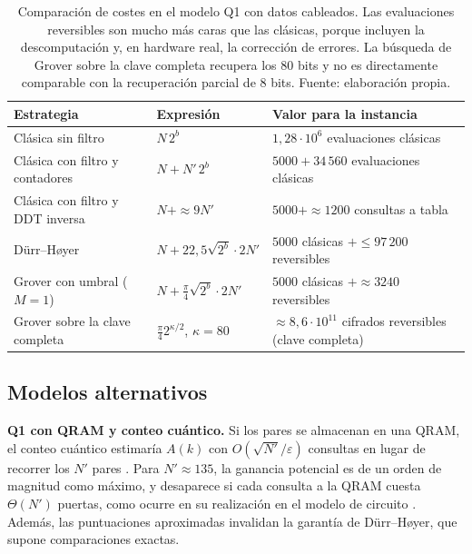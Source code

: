 \begin{table}[H]
\centering
\small
\begin{tabular}{p{} p{} p{}}
\hline\hline
Estrategia & Expresión & Valor para la instancia \\
\hline
Clásica sin filtro & \(N\,2^b\) & \(1{,}28\cdot 10^6\) evaluaciones clásicas \\
Clásica con filtro y contadores & \(N+N'\,2^b\) & \(5000+34\,560\) evaluaciones clásicas \\
Clásica con filtro y DDT inversa & \(N+\approx 9N'\) & \(5000+\approx 1200\) consultas a tabla \\
Dürr--Høyer & \(N+22{,}5\sqrt{2^b}\cdot 2N'\) & \(5000\) clásicas \(+\le 97\,200\) reversibles \\
Grover con umbral (\(M=1\)) & \(N+\frac{\pi}{4}\sqrt{2^b}\cdot 2N'\) & \(5000\) clásicas \(+\approx 3240\) reversibles \\
Grover sobre la clave completa & \(\frac{\pi}{4}2^{\kappa/2}\), \(\kappa=80\) & \(\approx 8{,}6\cdot 10^{11}\) cifrados reversibles (clave completa) \\
\hline
\end{tabular}
\caption[Comparación de costes en el modelo Q1]{Comparación de costes en el modelo Q1 con datos cableados. Las evaluaciones reversibles son mucho más caras que las clásicas, porque incluyen la descomputación y, en hardware real, la corrección de errores. La búsqueda de Grover sobre la clave completa recupera los 80 bits y no es directamente comparable con la recuperación parcial de 8 bits. Fuente: elaboración propia.}
\label{tab:costes}
\end{table}

\subsection{Modelos alternativos}

\textbf{Q1 con QRAM y conteo cuántico.} Si los pares se almacenan en una QRAM, el conteo cuántico estimaría \(A(k)\) con \(O(\sqrt{N'}/\varepsilon)\) consultas en lugar de recorrer los \(N'\) pares \citep{bht1998counting}. Para \(N'\approx 135\), la ganancia potencial es de un orden de magnitud como máximo, y desaparece si cada consulta a la QRAM cuesta \(\Theta(N')\) puertas, como ocurre en su realización en el modelo de circuito \citep{jaques2023qram}. Además, las puntuaciones aproximadas invalidan la garantía de Dürr--Høyer, que supone comparaciones exactas.

